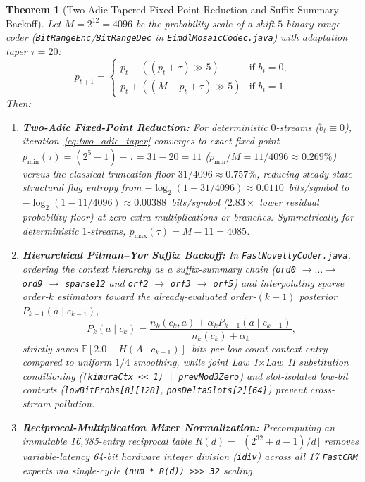 \documentclass[10pt]{article}
\newtheorem{theorem}{Theorem}
\theoremstyle{definition}
\begin{document}
\begin{theorem}[Two-Adic Tapered Fixed-Point Reduction and Suffix-Summary Backoff]
\label{thm:law6}
Let $M = 2^{12} = 4096$ be the probability scale of a shift-$5$ binary range coder (\texttt{BitRangeEnc}/\texttt{BitRangeDec} in \texttt{EimdlMosaicCodec.java}) with adaptation taper $\tau = 20$:
\begin{equation}
  p_{t+1} =
  \begin{cases}
    p_t - ((p_t + \tau) \gg 5) & \text{if } b_t = 0,\\
    p_t + ((M - p_t + \tau) \gg 5) & \text{if } b_t = 1.
  \end{cases}
  \label{eq:two_adic_taper}
\end{equation}
Then:
\begin{enumerate}
  \item \textbf{Two-Adic Fixed-Point Reduction:} For deterministic $0$-streams ($b_t \equiv 0$), iteration~\eqref{eq:two_adic_taper} converges to exact fixed point $p_{\min}(\tau) = (2^5 - 1) - \tau = 31 - 20 = 11$ ($p_{\min}/M = 11/4096 \approx 0.269\%$) versus the classical truncation floor $31/4096 \approx 0.757\%$, reducing steady-state structural flag entropy from $-\log_2(1 - 31/4096) \approx 0.0110$~bits/symbol to $-\log_2(1 - 11/4096) \approx 0.00388$~bits/symbol ($2.83\times$ lower residual probability floor) at zero extra multiplications or branches. Symmetrically for deterministic $1$-streams, $p_{\max}(\tau) = M - 11 = 4085$.
  \item \textbf{Hierarchical Pitman--Yor Suffix Backoff:} In \texttt{FastNoveltyCoder.java}, ordering the context hierarchy as a suffix-summary chain (\texttt{ord0} $\to \dots \to$ \texttt{ord9} $\to$ \texttt{sparse12} and \texttt{orf2} $\to$ \texttt{orf3} $\to$ \texttt{orf5}) and interpolating sparse order-$k$ estimators toward the already-evaluated order-$(k-1)$ posterior $P_{k-1}(a \mid c_{k-1})$,
  \begin{equation}
    P_k(a \mid c_k) = \frac{n_k(c_k, a) + \alpha_k P_{k-1}(a \mid c_{k-1})}{n_k(c_k) + \alpha_k},
  \end{equation}
  strictly saves $\mathbb{E}[2.0 - H(A \mid c_{k-1})]$~bits per low-count context entry compared to uniform $1/4$ smoothing, while joint Law~I$\times$Law~II substitution conditioning (\texttt{(kimuraCtx << 1) | prevMod3Zero}) and slot-isolated low-bit contexts (\texttt{lowBitProbs[8][128]}, \texttt{posDeltaSlots[2][64]}) prevent cross-stream pollution.
  \item \textbf{Reciprocal-Multiplication Mixer Normalization:} Precomputing an immutable 16,385-entry reciprocal table $R(d) = \lfloor (2^{32} + d - 1)/d \rfloor$ removes variable-latency 64-bit hardware integer division (\texttt{idiv}) across all 17 \texttt{FastCRM} experts via single-cycle \texttt{(num * R(d)) >>> 32} scaling.
\end{enumerate}
\end{theorem}
\end{document}
